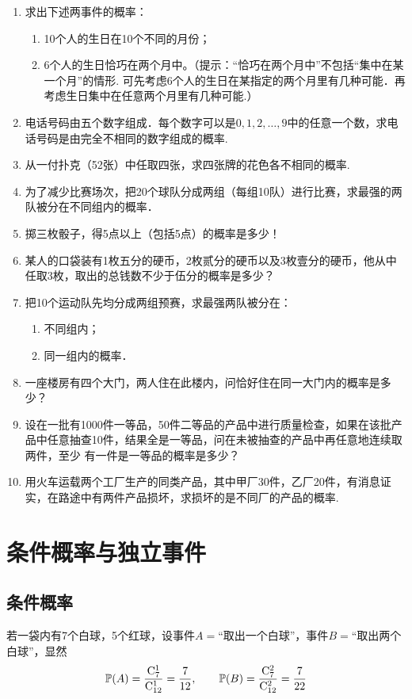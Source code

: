 \begin{enumerate}
\item 求出下述两事件的概率：
\begin{enumerate}[(1)]
    \item 10个人的生日在10个不同的月份；
\item 6个人的生日恰巧在两个月中。（提示：“恰巧在两个月中”不包括“集中在某一个月”的情形. 可先考虑6个人的生日在某指定的两个月里有几种可能．再考虑生日集中在任意两个月里有几种可能.）
\end{enumerate}

\item 电话号码由五个数字组成．每个数字可以是$0,1,2,\ldots,9$中的任意一个数，求电话号码是由完全不相同的数字组成的概率.
\item 从一付扑克（52张）中任取四张，求四张牌的花色各不相同的概率.
\item 为了减少比赛场次，把20个球队分成两组（每组10队）进行比赛，求最强的两队被分在不同组内的概率．
\item 掷三枚骰子，得5点以上（包括5点）的概率是多少！
\item 某人的口袋装有1枚五分的硬币，2枚贰分的硬币以及3枚壹分的硬币，他从中任取3枚，取出的总钱数不少于伍分的概率是多少？
\item 把10个运动队先均分成两组预赛，求最强两队被分在：
\begin{multicols}{2}
\begin{enumerate}[(1)]
\item 不同组内；    \item 同一组内的概率．
\end{enumerate}
\end{multicols}

\item 一座楼房有四个大门，两人住在此楼内，问恰好住在同一大门内的概率是多少？
\item 设在一批有1000件一等品，50件二等品的产品中进行质量检查，如果在该批产品中任意抽查10件，结果全是一等品，问在未被抽查的产品中再任意地连续取两件，至少
有一件是一等品的概率是多少？
\item 用火车运载两个工厂生产的同类产品，其中甲厂30件，乙厂20件，有消息证实，在路途中有两件产品损坏，求损坏的是不同厂的产品的概率.
\end{enumerate}

\section{条件概率与独立事件}
\subsection{条件概率}
若一袋内有7个白球，5个红球，设事件$A=$“取出一个白球”，事件$B=$“取出两个白球”，显然
\[\mathbb{P}(A)=\dfrac{{\rm C}^{1}_{7}}{{\rm C}^{1}_{12}}=\dfrac{7}{12},\qquad \mathbb{P}(B)=\dfrac{{\rm C}^{2}_{7}}{{\rm C}^{2}_{12}}=\dfrac{7}{22}\]

